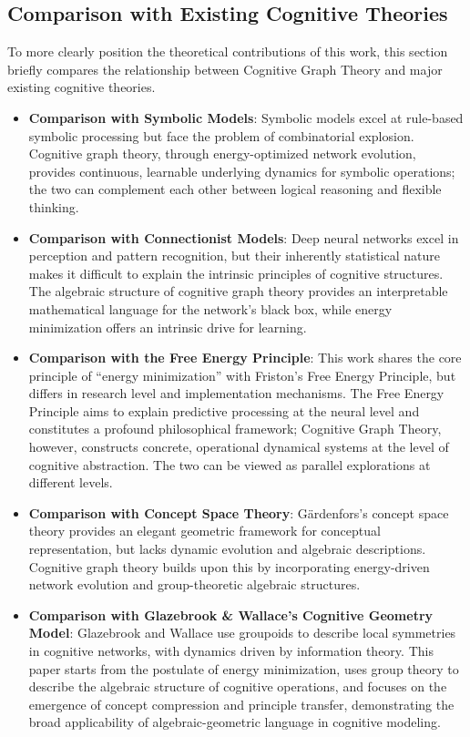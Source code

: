 \documentclass[10pt,onecolumn]{article}
\begin{document}
\subsection{Comparison with Existing Cognitive Theories}
\label{subsec:comparison_with_existing}

To more clearly position the theoretical contributions of this work, this section briefly compares the relationship between Cognitive Graph Theory and major existing cognitive theories.

\begin{itemize}
    \item \textbf{Comparison with Symbolic Models}: Symbolic models excel at rule-based symbolic processing but face the problem of combinatorial explosion. Cognitive graph theory, through energy-optimized network evolution, provides continuous, learnable underlying dynamics for symbolic operations; the two can complement each other between logical reasoning and flexible thinking.
    \item \textbf{Comparison with Connectionist Models}: Deep neural networks excel in perception and pattern recognition, but their inherently statistical nature makes it difficult to explain the intrinsic principles of cognitive structures. The algebraic structure of cognitive graph theory provides an interpretable mathematical language for the network's black box, while energy minimization offers an intrinsic drive for learning.
    \item \textbf{Comparison with the Free Energy Principle}: This work shares the core principle of “energy minimization” with Friston's Free Energy Principle, but differs in research level and implementation mechanisms. The Free Energy Principle aims to explain predictive processing at the neural level and constitutes a profound philosophical framework; Cognitive Graph Theory, however, constructs concrete, operational dynamical systems at the level of cognitive abstraction. The two can be viewed as parallel explorations at different levels.
    \item \textbf{Comparison with Concept Space Theory}: Gärdenfors’s concept space theory provides an elegant geometric framework for conceptual representation, but lacks dynamic evolution and algebraic descriptions. Cognitive graph theory builds upon this by incorporating energy-driven network evolution and group-theoretic algebraic structures.
    \item \textbf{Comparison with Glazebrook \& Wallace’s Cognitive Geometry Model}: Glazebrook and Wallace use groupoids to describe local symmetries in cognitive networks, with dynamics driven by information theory. This paper starts from the postulate of energy minimization, uses group theory to describe the algebraic structure of cognitive operations, and focuses on the emergence of concept compression and principle transfer, demonstrating the broad applicability of algebraic-geometric language in cognitive modeling.
\end{itemize}
\end{document}
